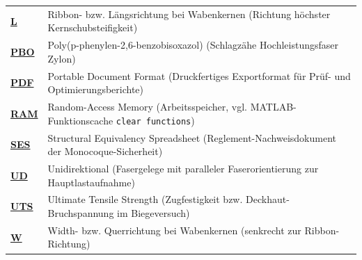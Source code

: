 \begin{tabularx}{\textwidth}{@{}l >{\raggedright\arraybackslash}X@{}}
\label{abk:L}\hyperref[sec:calibration]{\textbf{L}}       & Ribbon- bzw. Längsrichtung bei Wabenkernen (Richtung höchster Kernschubsteifigkeit) \\[0.4ex]
\label{abk:PBO}\hyperref[sec:materials_db]{\textbf{PBO}}   & Poly(p-phenylen-2,6-benzobisoxazol) (Schlagzähe Hochleistungsfaser Zylon) \\[0.4ex]
\label{abk:PDF}\hyperref[sec:optimize_panel]{\textbf{PDF}}   & Portable Document Format (Druckfertiges Exportformat für Prüf- und Optimierungsberichte) \\[0.4ex]
\label{abk:RAM}\hyperref[sec:ts_cache]{\textbf{RAM}}   & Random-Access Memory (Arbeitsspeicher, vgl. MATLAB-Funktionscache \texttt{clear functions}) \\[0.4ex]
\label{abk:SES}\hyperref[sec:systemzweck]{\textbf{SES}}   & Structural Equivalency Spreadsheet (Reglement-Nachweisdokument der Monocoque-Sicherheit) \\[0.4ex]
\label{abk:UD}\hyperref[tab:quickstart_materials]{\textbf{UD}}     & Unidirektional (Fasergelege mit paralleler Faserorientierung zur Hauptlastaufnahme) \\[0.4ex]
\label{abk:UTS}\hyperref[sec:calc_single_panel]{\textbf{UTS}}   & Ultimate Tensile Strength (Zugfestigkeit bzw. Deckhaut-Bruchspannung im Biegeversuch) \\[0.4ex]
\label{abk:W}\hyperref[sec:calibration]{\textbf{W}}       & Width- bzw. Querrichtung bei Wabenkernen (senkrecht zur Ribbon-Richtung) \\
\end{tabularx}

